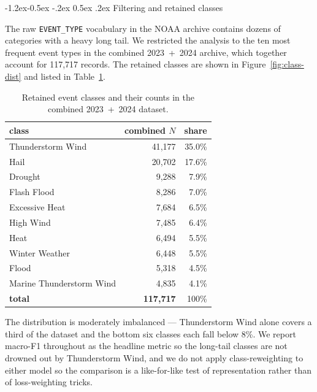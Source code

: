\documentclass[11pt]{article}
\makeatletter
\renewcommand\subsection{\@startsection{subsection}{2}{\z@}%
  {-1.2ex\@plus -0.5ex \@minus -.2ex}%
  {0.5ex \@plus .2ex}%
  {\normalfont\normalsize\bfseries}}
\newcommand{\mF}{macro-F1}
\makeatother
\begin{document}
\subsection{Filtering and retained classes}

The raw \texttt{EVENT\_TYPE} vocabulary in the NOAA archive contains
dozens of categories with a heavy long tail. We restricted the
analysis to the ten most frequent event types in the combined
2023~+~2024 archive, which together account for 117{,}717 records.
The retained classes are shown in Figure~\ref{fig:class-dist} and
listed in Table~\ref{tab:classes}.

\begin{table}[h]
  \centering
  \small
  \caption{Retained event classes and their counts in the combined
  2023~+~2024 dataset.}
  \label{tab:classes}
  \begin{tabular}{lrr}
    \toprule
    class & combined $N$ & share \\
    \midrule
    Thunderstorm Wind         & 41{,}177 & 35.0\% \\
    Hail                      & 20{,}702 & 17.6\% \\
    Drought                   &  9{,}288 &  7.9\% \\
    Flash Flood               &  8{,}286 &  7.0\% \\
    Excessive Heat            &  7{,}684 &  6.5\% \\
    High Wind                 &  7{,}485 &  6.4\% \\
    Heat                      &  6{,}494 &  5.5\% \\
    Winter Weather            &  6{,}448 &  5.5\% \\
    Flood                     &  5{,}318 &  4.5\% \\
    Marine Thunderstorm Wind  &  4{,}835 &  4.1\% \\
    \midrule
    \textbf{total}            & \textbf{117{,}717} & 100\% \\
    \bottomrule
  \end{tabular}
\end{table}

The distribution is moderately imbalanced --- Thunderstorm Wind
alone covers a third of the dataset and the bottom six classes each
fall below 8\%. We report \mF{} throughout as the headline metric so
the long-tail classes are not drowned out by Thunderstorm Wind, and
we do not apply class-reweighting to either model so the comparison
is a like-for-like test of representation rather than of
loss-weighting tricks.
\end{document}
